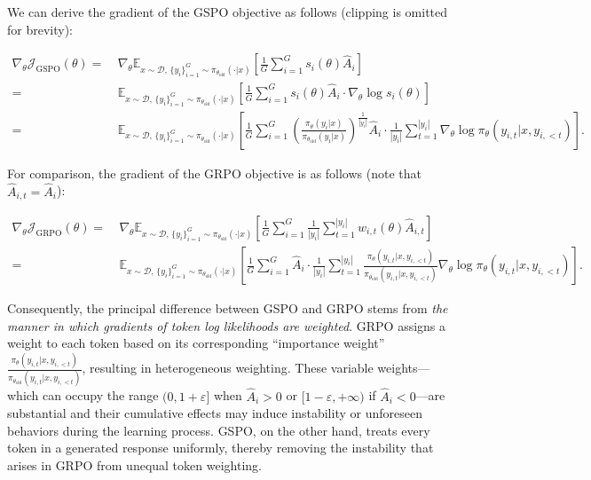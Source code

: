 We can derive the gradient of the GSPO objective as follows (clipping is omitted for brevity):

\begin{align}
\nabla_{\theta} \mathcal{J}_\text{GSPO} (\theta)
=&\ 
\nabla_{\theta} \mathbb{E}_{ x \sim \mathcal{D},\, \{y_i\}_{i=1}^G \sim \pi_{\theta_\text{old}}( \cdot | x) }
\left[ 
\frac{1}{G} \sum_{i=1}^{G} s_{i}(\theta) \widehat{A}_{i}
\right] \\
= &\ 
\mathbb{E}_{ x \sim \mathcal{D},\, \{y_i\}_{i=1}^G \sim \pi_{\theta_\text{old}}( \cdot | x) }
\left[ 
\frac{1}{G} \sum_{i=1}^{G}
s_{i}(\theta) \widehat{A}_{i}
\cdot \nabla_{\theta} \log s_{i}(\theta)
\right] \\
=&\ 
\mathbb{E}_{ x \sim \mathcal{D},\, \{y_i\}_{i=1}^G \sim \pi_{\theta_\text{old}}( \cdot | x) }
\left[ 
\frac{1}{G} \sum_{i=1}^{G} 
\left( \frac{ \pi_{\theta} (y_i | x) }{ \pi_{\theta_\text{old}} (y_i | x)} \right)^{\frac{1}{|y_i|}} \widehat{A}_{i} 
\cdot \frac{1}{|y_i|} \sum_{t=1}^{|y_i|} \nabla_{\theta} \log \pi_{\theta} (y_{i,t} | x, y_{i,<t}) 
\right].
\label{equ:gspo_grad}
\end{align}

For comparison, the gradient of the GRPO objective is as follows (note that $\widehat{A}_{i,t} = \widehat{A}_{i}$):

\begin{align}
\nabla_{\theta} \mathcal{J}_\text{GRPO} (\theta) 
=&\ 
\nabla_{\theta} \mathbb{E}_{ x \sim \mathcal{D},\, \{y_i\}_{i=1}^G \sim \pi_{\theta_\text{old}}( \cdot | x) }
\left[ \frac{1}{G} \sum_{i=1}^{G} \frac{1}{|y_i|} \sum_{t=1}^{|y_i|} 
w_{i,t}(\theta) \widehat{A}_{i,t}
\right] \\
=&\
\mathbb{E}_{ x \sim \mathcal{D},\, \{y_i\}_{i=1}^G \sim \pi_{\theta_\text{old}}( \cdot | x) }
\left[ \frac{1}{G} \sum_{i=1}^{G} \widehat{A}_{i} 
\cdot \frac{1}{|y_i|} \sum_{t=1}^{|y_i|} 
\frac{ \pi_{\theta} (y_{i,t} | x, y_{i,<t}) }{ \pi_{\theta_\text{old}} (y_{i,t} | x,y_{i,<t})} 
\nabla_{\theta} \log \pi_{\theta} (y_{i,t} | x, y_{i,<t})  
\right].
\end{align}

Consequently, the principal difference between GSPO and GRPO stems from \textit{the manner in which gradients of token log likelihoods are weighted}. GRPO assigns a weight to each token based on its corresponding ``importance weight'' $\frac{ \pi_{\theta} (y_{i,t} | x, y_{i,<t}) }{ \pi_{\theta_\text{old}} (y_{i,t} | x,y_{i,<t})}$, resulting in heterogeneous weighting. These variable weights—which can occupy the range $(0, 1+\varepsilon]$ when $\widehat{A}_{i} >0$ or $[1-\varepsilon, +\infty)$ if $\widehat{A}_{i} < 0$—are substantial and their cumulative effects may induce instability or unforeseen behaviors during the learning process. GSPO, on the other hand, treats every token in a generated response uniformly, thereby removing the instability that arises in GRPO from unequal token weighting.


